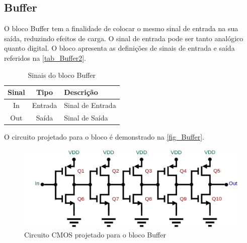 \renewcommand{\NomeBloco}{Buffer}
\renewcommand{\NomePTab}{tab_\NomeBloco}
\renewcommand{\NomeSTab}{tab_\NomeBloco2}
\renewcommand{\NomePFig}{fig_\NomeBloco}
\renewcommand{\NomeSFig}{fig_\NomeBloco2}
\renewcommand{\NomeTTab}{tab_\NomeBloco3}

\subsection{\NomeBloco}
\label{inversor1}

O bloco \NomeBloco{} tem a finalidade de colocar o mesmo sinal de entrada na sua sa\'ida, reduzindo efeitos de carga. O sinal de entrada pode ser tanto anal\'ogico quanto digital. O bloco apresenta as defini{\c c}\~oes de sinais de entrada e sa\'ida referidos na \autoref{\NomeSTab}.

\begin{table}[htb]
\caption{Sinais do bloco \NomeBloco}
\label{\NomeSTab}
\centering
\begin{tabular}{ccl}

    \toprule
    Sinal & Tipo    & Descri{\c c}\~ao        \\
    \midrule \midrule
    In    & Entrada & Sinal de Entrada \\
    \midrule
    Out   & Saída   & Sinal de Sa\'ida   \\
    \bottomrule
\end{tabular}
\end{table}

O circuito projetado para o bloco \'e demonstrado na \autoref{\NomePFig}.

\begin{figure}[htb]
 \label{NomePFig}
 \centering
    \caption{Circuito CMOS projetado para o bloco \NomeBloco} \label{\NomePFig}
    \includegraphics[scale=0.35]{Circuitos/Buffer.png}
\end{figure}


